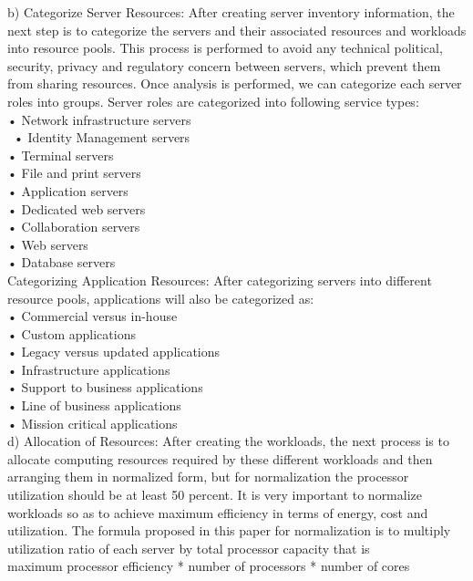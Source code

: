 \documentclass[12pt,a4paper]{report}
\begin{document}
 b) Categorize Server Resources: After creating server inventory information, the next step is to categorize the servers and their associated resources and workloads into resource pools. This process is performed to avoid any technical political, security, privacy and regulatory concern between servers, which prevent them from sharing resources. Once analysis is performed, we can categorize each server roles into groups. Server roles are categorized into following service types:\\
 • Network infrastructure servers \\\
• Identity Management servers \\
• Terminal servers\\
 • File and print servers\\
 • Application servers\\
 • Dedicated web servers \\
• Collaboration servers\\
 • Web servers\\
 • Database servers\\

Categorizing Application Resources: After categorizing servers into different resource pools, applications will also be categorized as: \\
 • Commercial versus in-house\\
 • Custom applications\\
 • Legacy versus updated applications \\
• Infrastructure applications\\
 • Support to business applications \\
• Line of business applications\\
 • Mission critical applications \\
 
d) Allocation of Resources: After creating the workloads, the next process is to allocate computing resources required by these different workloads and then arranging them in normalized form, but for normalization the processor utilization should be at least 50 percent. It is very important to normalize workloads so as to achieve maximum efficiency in terms of energy, cost and utilization. The formula proposed in this paper for normalization is to multiply utilization ratio of each server by total processor capacity that is\\
maximum processor efficiency * number of processors * number of cores\\
\end{document}
